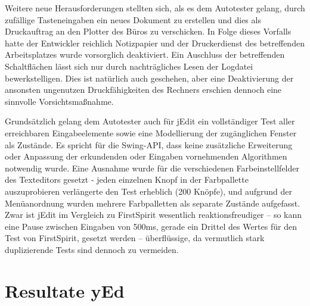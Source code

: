 Weitere neue Herausforderungen stellten sich, als es dem
Autotester gelang, durch zufällige Tasteneingaben ein neues 
Dokument zu erstellen und dies als Druckauftrag 
an den Plotter des Büros zu verschicken. In Folge dieses Vorfalls
hatte der Entwickler reichlich Notizpapier und der Druckerdienst
des betreffenden Arbeitsplatzes wurde vorsorglich deaktiviert.
Ein Auschluss der betreffenden Schaltflächen lässt sich
nur durch nachträgliches Lesen der Logdatei bewerkstelligen.
Dies ist natürlich auch geschehen, aber eine Deaktivierung
der ansonsten ungenutzen Druckfähigkeiten des Rechners
erschien dennoch eine sinnvolle Vorsichtsmaßnahme.

Grundsätzlich gelang dem Autotester auch für jEdit ein
vollständiger Test aller erreichbaren Eingabeelemente
sowie eine Modellierung der zugänglichen Fenster als
Zustände. Es spricht für die Swing-API, dass keine
zusätzliche Erweiterung oder Anpassung der erkundenden
oder Eingaben vornehmenden Algorithmen notwendig wurde.
Eine Ausnahme wurde für die verschiedenen Farbeinstellfelder
des Texteditors gesetzt - jeden einzelnen Knopf in der Farbpallette
auszuprobieren verlängerte den Test erheblich (200 Knöpfe),
und aufgrund der Menüanordnung wurden mehrere Farbpalletten
als separate Zustände aufgefasst. Zwar ist jEdit im Vergleich
zu FirstSpirit wesentlich reaktionsfreudiger -- so kann eine
Pause zwischen Eingaben von 500ms, gerade ein Drittel
des Wertes für den Test von FirstSpirit, gesetzt werden --
überflüssige, da vermutlich stark duplizierende Tests
sind dennoch zu vermeiden.


\section{Resultate yEd}\label{section:testresultsyed}

